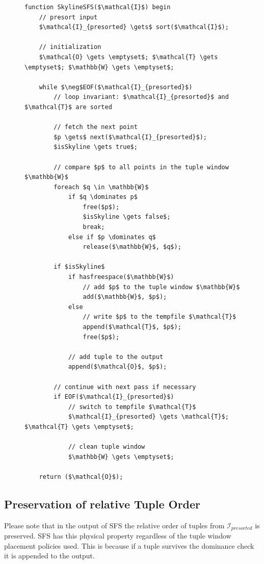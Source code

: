 \begin{figure}[htbp]
\begin{lstlisting}[language=pseudo,
caption={Sort-First-Skyline (SFS) Algorithm},
label={code:sfs}
]
function SkylineSFS($\mathcal{I}$) begin 
	// presort input
	$\mathcal{I}_{presorted} \gets$ sort($\mathcal{I}$);

	// initialization
	$\mathcal{O} \gets \emptyset$; $\mathcal{T} \gets \emptyset$; $\mathbb{W} \gets \emptyset$;

	while $\neg$EOF($\mathcal{I}_{presorted}$)
		// loop invariant: $\mathcal{I}_{presorted}$ and $\mathcal{T}$ are sorted

		// fetch the next point
		$p \gets$ next($\mathcal{I}_{presorted}$);
		$isSkyline \gets true$;

		// compare $p$ to all points in the tuple window $\mathbb{W}$
		foreach $q \in \mathbb{W}$
			if $q \dominates p$
				free($p$);
				$isSkyline \gets false$;
				break;
			else if $p \dominates q$
				release($\mathbb{W}$, $q$);

		if $isSkyline$
			if hasfreespace($\mathbb{W}$)
				// add $p$ to the tuple window $\mathbb{W}$
				add($\mathbb{W}$, $p$);
			else
				// write $p$ to the tempfile $\mathcal{T}$
				append($\mathcal{T}$, $p$);
				free($p$);

			// add tuple to the output
			append($\mathcal{O}$, $p$);

		// continue with next pass if necessary
		if EOF($\mathcal{I}_{presorted}$)
			// switch to tempfile $\mathcal{T}$
			$\mathcal{I}_{presorted} \gets \mathcal{T}$; $\mathcal{T} \gets \emptyset$;

			// clean tuple window
			$\mathbb{W} \gets \emptyset$;

	return ($\mathcal{O}$);
\end{lstlisting}
\end{figure}

\subsection{Preservation of relative Tuple Order}
\label{sec:sfs-tuple-order}
Please note that in the output of SFS the relative order of tuples
from $\mathcal{I}_{presorted}$ is preserved.  SFS has this physical
property regardless of the tuple window placement policies used.
This is because if a tuple survives the dominance check it is appended
to the output.



